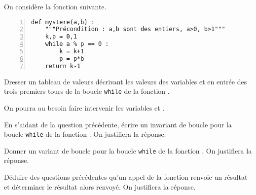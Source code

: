 On considère la fonction suivante. 
\begin{Verbatim}[gobble=0,numbers=left]
def mystere(a,b) :
    """Précondition : a,b sont des entiers, a>0, b>1"""
    k,p = 0,1
    while a % p == 0 :
        k = k+1
        p = p*b
    return k-1
\end{Verbatim}

\question{} Dresser un tableau de valeurs décrivant les valeurs des variables  et  en entrée des trois premiers tours de la boucle \texttt{while} de la fonction . 

On pourra au besoin faire intervenir les variables  et . 

\medskip{}

\question{} En s'aidant de la question précédente, écrire un invariant de boucle pour la boucle \texttt{while} de la fonction . On justifiera la réponse. 

\medskip{}

\question{} Donner un variant de boucle pour la boucle \texttt{while} de la fonction . On justifiera la réponse. 

\medskip{}

\question{} Déduire des questions précédentes qu'un appel de la fonction  renvoie un résultat et déterminer le résultat alors renvoyé. On justifiera la réponse. 
